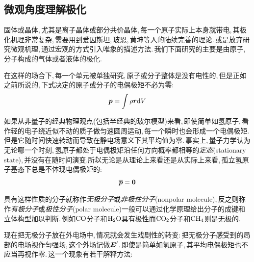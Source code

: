 \subsection{微观角度理解极化}

固体或晶体,\,尤其是离子晶体或部分共价晶体,\,每一个原子实际上本身就带电,\,其极化机理非常复杂,\,需要用到爱因斯坦,\,玻恩,\,黄坤等人的陆续完善的理论.\,或是放弃研究微观机理,\,通过宏观的方式引入唯象的描述方法.\,我们下面研究的主要是由原子,\,分子构成的气体或者液体的极化.

在这样的场合下,\,每一个单元被单独研究,\,原子或分子整体是没有电性的,\,但是正如之前所说的,\,下式决定的原子或分子的电偶极矩不必为零:
\[\boldsymbol{p}=\int \rho \boldsymbol{r} \textrm{d} V\]

如果从非量子的经典物理观点(包括半经典的玻尔模型)来看,\,即使简单如氢原子,\,看作轻的电子绕近似不动的质子做匀速圆周运动,\,每一个瞬时也会形成一个电偶极矩.\,但是它随时间快速转动而导致在静电场意义下其平均值为零.\,事实上,\,量子力学认为无论哪一个时刻,\,氢原子都处于电偶极矩沿任何方向概率都相等的\emph{定态}(stationary state),\,并没有在随时间演变.\.所以无论是从理论上来看还是从实际上来看,\,孤立氢原子基态下总是不体现电偶极矩的:
\[\overline{\boldsymbol{p}}=\boldsymbol{0}\]

具有这样性质的分子就称作\emph{无极分子}或\emph{非极性分子}(nonpolar molecule),\,反之则称作\emph{有极分子}或\emph{极性分子}(polar molecule)一般可以通过化学原理给出分子的成键和立体构型加以判断.\,例如${\rm CO}$分子和${\rm H_2 O}$具有极性而${\rm CO_2}$分子和${\rm CH_4}$则是无极的.

现在把无极分子放在外电场中,\,情况就会发生戏剧性的转变:\,把无极分子感受到的局部的电场视作匀强场,\,这个外场记做$\boldsymbol{E}'$.\,即使是简单如氢原子,\,其平均电偶极矩也不应当再视作零.\,这一个现象有若干解释方法:

